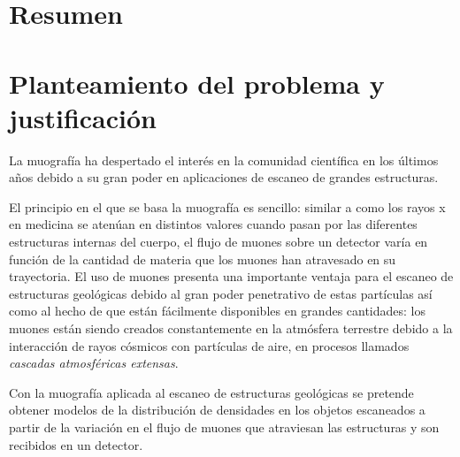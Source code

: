 \documentclass[12pt]{report}
\begin{document}

\section*{Resumen}




\section*{Planteamiento del problema y justificación}

La muografía ha despertado el interés en la comunidad científica en los últimos años debido a su gran poder en aplicaciones de escaneo de grandes estructuras.

El principio en el que se basa la muografía es sencillo: similar a como los rayos x en medicina se atenúan en distintos valores cuando pasan por las diferentes estructuras internas del cuerpo, el flujo de muones sobre un detector varía en función de la cantidad de materia que los muones han atravesado en su trayectoria. El uso de muones presenta una importante ventaja para el escaneo de estructuras geológicas debido al gran poder penetrativo de estas partículas así como al hecho de que están fácilmente disponibles en grandes cantidades: los muones están siendo creados constantemente en la atmósfera terrestre debido a la interacción de rayos cósmicos con partículas de aire, en procesos llamados \textit{cascadas atmosféricas extensas}.

Con la muografía aplicada al escaneo de estructuras geológicas se pretende obtener modelos de la distribución de densidades en los objetos escaneados a partir de la variación en el flujo de muones que atraviesan las estructuras y son recibidos en un detector.
\end{document}
